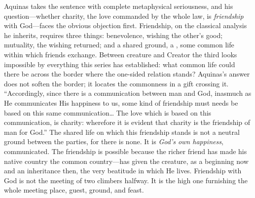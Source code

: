 Aquinas takes the sentence with complete metaphysical seriousness, and his question---whether charity, the love commanded by the whole law, is \emph{friendship} with God---faces the obvious objection first. Friendship, on the classical analysis he inherits, requires three things: benevolence, wishing the other's good; mutuality, the wishing returned; and a shared ground, a , some common life within which friends exchange. Between creature and Creator the third looks impossible by everything this series has established: what common life could there be across the border where the one-sided relation stands? Aquinas's answer does not soften the border; it locates the commonness in a gift crossing it. ``Accordingly, since there is a communication between man and God, inasmuch as He communicates His happiness to us, some kind of friendship must needs be based on this same communication\ldots{} The love which is based on this communication, is charity: wherefore it is evident that charity is the friendship of man for God.'' The shared life on which this friendship stands is not a neutral ground between the parties, for there is none. It is \emph{God's own happiness}, communicated. The friendship is possible because the richer friend has made his native country the common country---has given the creature, as a beginning now and an inheritance then, the very beatitude in which He lives. Friendship with God is not the meeting of two climbers halfway. It is the high one furnishing the whole meeting place, guest, ground, and feast.

